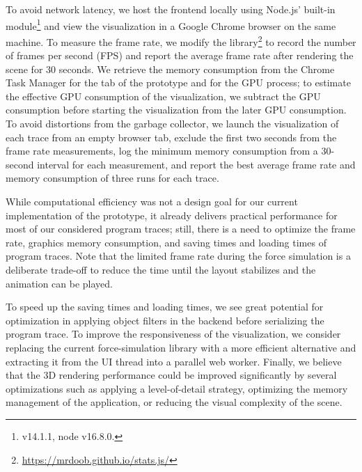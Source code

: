 To avoid network latency, we host the \tfd{} frontend locally using Node.js' built-in  module\footnote{ v14.1.1, node v16.8.0.} and view the visualization in a Google Chrome browser on the same machine.
To measure the frame rate, we modify the  library\footnote{\url{https://mrdoob.github.io/stats.js/}} to record the number of frames per second (FPS) and report the average frame rate after rendering the scene for 30 seconds.
We retrieve the memory consumption from the Chrome Task Manager for the tab of the \tfd{} prototype and for the GPU process; to estimate the effective GPU consumption of the visualization, we subtract the GPU consumption before starting the visualization from the later GPU consumption.
To avoid distortions from the garbage collector, we launch the visualization of each trace from an empty browser tab, exclude the first two seconds from the frame rate measurements, log the minimum memory consumption from a 30-second interval for each measurement, and report the best average frame rate and memory consumption of three runs for each trace.

While computational efficiency was not a design goal for our current implementation of the \tfd{} prototype, it already delivers practical performance for most of our considered program traces; still, there is a need to optimize the frame rate, graphics memory consumption, and saving times and loading times of program traces.
Note that the limited frame rate during the force simulation is a deliberate trade-off to reduce the time until the layout stabilizes and the animation can be played.

To speed up the saving times and loading times, we see great potential for optimization in applying object filters in the backend before serializing the program trace.
To improve the responsiveness of the visualization, we consider replacing the current force-simulation library  with a more efficient alternative and extracting it from the UI thread into a parallel web worker.
Finally, we believe that the 3D rendering performance could be improved significantly by several optimizations such as applying a level-of-detail strategy, optimizing the memory management of the application, or reducing the visual complexity of the scene.
